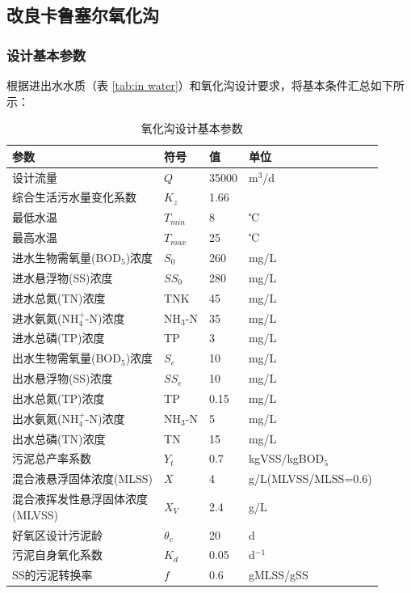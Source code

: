 \subsection{改良卡鲁塞尔氧化沟}
\subsubsection{设计基本参数}
根据进出水水质（表 \ref{tab:in water}）和氧化沟设计要求，将基本条件汇总如下所示：
\begin{table}[H]
	\centering
	\caption{氧化沟设计基本参数}
	\begin{tabular}{p{} *{2}{p{}}p{}}
		\toprule
		参数    & 符号    & 值     & 单位 \\
		\midrule
		设计流量  & $Q$ & 35000 & m$^3$/d \\
		综合生活污水量变化系数 & $K_z$ & 1.66 &  \\
		最低水温  & $T_{min}$  & 8     & ℃ \\
		最高水温  & $T_{max}$  & 25    & ℃ \\
		\midrule
		进水生物需氧量(BOD$_5$)浓度 & $S_0$    & 260   & mg/L \\
		进水悬浮物(SS)浓度 & $SS_0$   & 280   & mg/L \\
		进水总氮(TN)浓度 & TNK   & 45    & mg/L \\
		进水氨氮(NH$_4^+$-N)浓度 & NH$_3$-N & 35    & mg/L \\
		进水总磷(TP)浓度 & TP    & 3     & mg/L \\
		\midrule
		出水生物需氧量(BOD$_5$)浓度 & $S_e$    & 10    & mg/L \\
		出水悬浮物(SS)浓度 & $SS_e$   & 10    & mg/L \\
		出水总氮(TP)浓度 & TP    & 0.15  & mg/L \\
		出水氨氮(NH$_4^+$-N)浓度 & NH$_3$-N & 5     & mg/L \\
		出水总磷(TN)浓度 & TN    & 15    & mg/L \\
		\midrule
		污泥总产率系数 & $Y_t$ & 0.7 & kgVSS/kgBOD$_5$ \\
		混合液悬浮固体浓度(MLSS) & $X$ & 4 & g/L(MLVSS/MLSS=0.6) \\
		\makecell[l]{混合液挥发性悬浮固体浓度\\(MLVSS)} & $X_V$ & 2.4 & g/L \\
		好氧区设计污泥龄 & $\theta_c$ & 20 & d \\
		污泥自身氧化系数 & $K_d$ & 0.05 & d$^{-1}$ \\
		SS的污泥转换率 & $f$ & 0.6 & gMLSS/gSS \\
		\bottomrule
	\end{tabular}%
	\label{tab:Basic conditions for oxidation ditch design}%
\end{table}%


